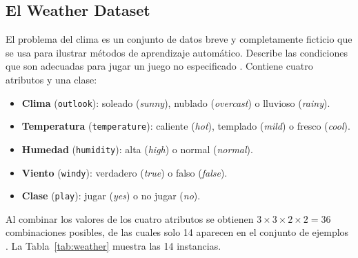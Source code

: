 \documentclass[11pt,letterpaper]{article}
\begin{document}
\subsection{El Weather Dataset}

El problema del clima es un conjunto de datos breve y completamente ficticio que se usa para ilustrar métodos de aprendizaje automático. Describe las condiciones que son adecuadas para jugar un juego no especificado \parencite{witten2017,tecnm2026_documento_fuente}. Contiene cuatro atributos y una clase:

\begin{itemize}
    \item \textbf{Clima} (\texttt{outlook}): soleado (\textit{sunny}), nublado (\textit{overcast}) o lluvioso (\textit{rainy}).
    \item \textbf{Temperatura} (\texttt{temperature}): caliente (\textit{hot}), templado (\textit{mild}) o fresco (\textit{cool}).
    \item \textbf{Humedad} (\texttt{humidity}): alta (\textit{high}) o normal (\textit{normal}).
    \item \textbf{Viento} (\texttt{windy}): verdadero (\textit{true}) o falso (\textit{false}).
    \item \textbf{Clase} (\texttt{play}): jugar (\textit{yes}) o no jugar (\textit{no}).
\end{itemize}

Al combinar los valores de los cuatro atributos se obtienen $3 \times 3 \times 2 \times 2 = 36$ combinaciones posibles, de las cuales solo 14 aparecen en el conjunto de ejemplos \parencite{tecnm2026_documento_fuente}. La Tabla~\ref{tab:weather} muestra las 14 instancias.
\end{document}
